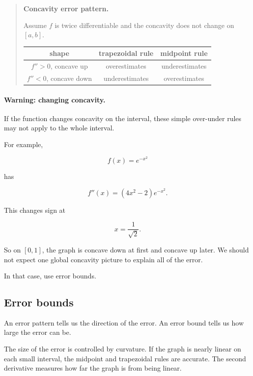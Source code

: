 \begin{quote}
\textbf{Concavity error pattern.}

Assume \(f\) is twice differentiable and the concavity does not change on \([a,b]\).

\begin{center}
\begin{tabular}{c|c|c}
\textbf{shape} & \textbf{trapezoidal rule} & \textbf{midpoint rule} \\ \hline
\(f''>0\), concave up & overestimates & underestimates \\[3pt]
\(f''<0\), concave down & underestimates & overestimates
\end{tabular}
\end{center}
\end{quote}

\paragraph{Warning: changing concavity.}
If the function changes concavity on the interval, these simple over-under rules may not
apply to the whole interval.

For example,

\[
f(x)=e^{-x^2}
\]

has

\[
f''(x)=(4x^2-2)e^{-x^2}.
\]

This changes sign at

\[
x=\frac{1}{\sqrt2}.
\]

So on \([0,1]\), the graph is concave down at first and concave up later.  We should not
expect one global concavity picture to explain all of the error.

In that case, use error bounds.

\subsection{Error bounds}
\label{subsec:midpoint-trapezoid-error-bounds}

An error pattern tells us the direction of the error.  An error bound tells us how large the
error can be.

The size of the error is controlled by curvature.  If the graph is nearly linear on each
small interval, the midpoint and trapezoidal rules are accurate.  The second derivative
measures how far the graph is from being linear.

